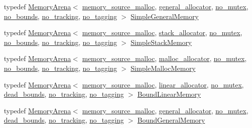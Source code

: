 \begin{DoxyCompactItemize}
\item 
typedef \hyperlink{classcrap_1_1_memory_arena}{Memory\+Arena}$<$ \hyperlink{classcrap_1_1memory__source__malloc}{memory\+\_\+source\+\_\+malloc}, \hyperlink{classcrap_1_1general__allocator}{general\+\_\+allocator}, \hyperlink{structcrap_1_1no__mutex}{no\+\_\+mutex}, \hyperlink{structcrap_1_1no__bounds}{no\+\_\+bounds}, \hyperlink{structcrap_1_1no__tracking}{no\+\_\+tracking}, \hyperlink{structcrap_1_1no__tagging}{no\+\_\+tagging} $>$ \hyperlink{namespacecrap_a0f685df0fdfec9a4cbf9aaeab41a73a5}{Simple\+General\+Memory}
\item 
typedef \hyperlink{classcrap_1_1_memory_arena}{Memory\+Arena}$<$ \hyperlink{classcrap_1_1memory__source__malloc}{memory\+\_\+source\+\_\+malloc}, \hyperlink{classcrap_1_1stack__allocator}{stack\+\_\+allocator}, \hyperlink{structcrap_1_1no__mutex}{no\+\_\+mutex}, \hyperlink{structcrap_1_1no__bounds}{no\+\_\+bounds}, \hyperlink{structcrap_1_1no__tracking}{no\+\_\+tracking}, \hyperlink{structcrap_1_1no__tagging}{no\+\_\+tagging} $>$ \hyperlink{namespacecrap_a1265b2d1470f9e9196ec1ffcb2fd0701}{Simple\+Stack\+Memory}
\item 
typedef \hyperlink{classcrap_1_1_memory_arena}{Memory\+Arena}$<$ \hyperlink{classcrap_1_1memory__source__malloc}{memory\+\_\+source\+\_\+malloc}, \hyperlink{classcrap_1_1malloc__allocator}{malloc\+\_\+allocator}, \hyperlink{structcrap_1_1no__mutex}{no\+\_\+mutex}, \hyperlink{structcrap_1_1no__bounds}{no\+\_\+bounds}, \hyperlink{structcrap_1_1no__tracking}{no\+\_\+tracking}, \hyperlink{structcrap_1_1no__tagging}{no\+\_\+tagging} $>$ \hyperlink{namespacecrap_a8711640793bf2ed760185fe66c8e3d03}{Simple\+Malloc\+Memory}
\item 
typedef \hyperlink{classcrap_1_1_memory_arena}{Memory\+Arena}$<$ \hyperlink{classcrap_1_1memory__source__malloc}{memory\+\_\+source\+\_\+malloc}, \hyperlink{classcrap_1_1linear__allocator}{linear\+\_\+allocator}, \hyperlink{structcrap_1_1no__mutex}{no\+\_\+mutex}, \hyperlink{structcrap_1_1dead__bounds}{dead\+\_\+bounds}, \hyperlink{structcrap_1_1no__tracking}{no\+\_\+tracking}, \hyperlink{structcrap_1_1no__tagging}{no\+\_\+tagging} $>$ \hyperlink{namespacecrap_aa20da4e8cbab540052136fe0dc25815c}{Bound\+Linear\+Memory}
\item 
typedef \hyperlink{classcrap_1_1_memory_arena}{Memory\+Arena}$<$ \hyperlink{classcrap_1_1memory__source__malloc}{memory\+\_\+source\+\_\+malloc}, \hyperlink{classcrap_1_1general__allocator}{general\+\_\+allocator}, \hyperlink{structcrap_1_1no__mutex}{no\+\_\+mutex}, \hyperlink{structcrap_1_1dead__bounds}{dead\+\_\+bounds}, \hyperlink{structcrap_1_1no__tracking}{no\+\_\+tracking}, \hyperlink{structcrap_1_1no__tagging}{no\+\_\+tagging} $>$ \hyperlink{namespacecrap_aaff1250c80e3631796871d2e94b4d187}{Bound\+General\+Memory}

\end{DoxyCompactItemize}
